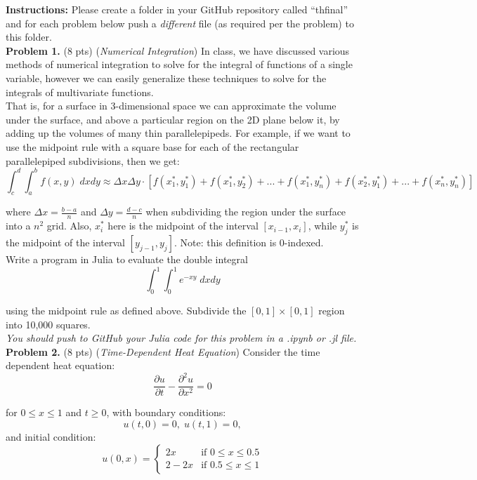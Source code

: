 \documentclass[12pt]{article}
\begin{document}
\bigskip


{\bf Instructions: }Please create a folder in your GitHub repository called ``thfinal'' and for each problem below push a \emph{different} file (as required per the problem) to this folder.\\ 

{\bf Problem 1. }(8 pts) (\emph{Numerical Integration}) In class, we have discussed various methods of numerical integration to solve for the integral of functions of a single variable, however we can easily generalize these techniques to solve for the integrals of multivariate functions. \\

That is, for a surface in 3-dimensional space we can approximate the volume under the surface, and above a particular region on the 2D plane below it, by adding up the volumes of many thin parallelepipeds. For example, if we want to use the midpoint rule with a square base for each of the rectangular parallelepiped subdivisions, then we get:
\[
\int_c^d \int_a^b f(x,y) \; dxdy \approx \Delta x \Delta y \cdot [f(x^*_1,y^*_1) + f(x^*_1,y^*_2) + ... + f(x^*_1,y^*_n) + f(x^*_2,y^*_1) + ... + f(x^*_n,y^*_n)]
\]

where $\Delta x = \frac{b - a}{n}$ and $\Delta y = \frac{d - c}{n}$ when subdividing the region under the surface into a $n^2$ grid. Also, $x^*_i$ here is the midpoint of the interval $[x_{i-1}, x_i]$, while $y^*_j$ is the midpoint of the interval $[y_{j-1}, y_{j}]$. Note: this definition is 0-indexed.\\

Write a program in Julia to evaluate the double integral 
\[
\int_0^1 \int_0^1 e^{-xy} \; dxdy
\]

using the midpoint rule as defined above. Subdivide the $[0,1] \times [0,1]$ region into 10,000 squares. \\ 

\emph{\color{magenta} You should push to GitHub your Julia code for this problem in a .ipynb or .jl file.}\\

{\bf Problem 2. }(8 pts) (\emph{Time-Dependent Heat Equation}) Consider the time dependent heat equation:
\[ 
\frac{\partial u}{\partial t} - \frac{\partial^2 u}{\partial x^2} = 0
\]

for $0 \leq x \leq 1$ and $t \geq 0$, with boundary conditions:
\[
u(t,0) = 0, \; u(t,1) = 0,
\]
and initial condition:
\[
u(0,x) = \begin{cases}
2x & \text{if } 0 \leq x \leq 0.5\\
2 - 2x & \text{if } 0.5 \leq x \leq 1
\end{cases}
\]
\end{document}
